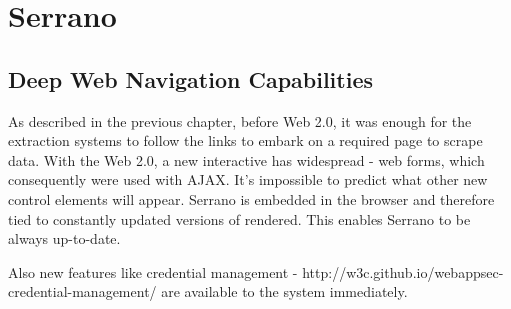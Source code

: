 \chapter{Serrano}

\section{Deep Web Navigation Capabilities}
As described in the previous chapter, before Web 2.0, it was enough for the extraction systems to follow the links to embark on a required page to scrape data.
With the Web 2.0, a new interactive has widespread - web forms, which consequently were used with AJAX. It's impossible to predict what other new control elements will appear. Serrano is embedded in the browser and therefore tied to constantly updated versions of rendered. This enables Serrano to be always up-to-date.

Also new features like credential management - http://w3c.github.io/webappsec-credential-management/ are available to the system immediately.